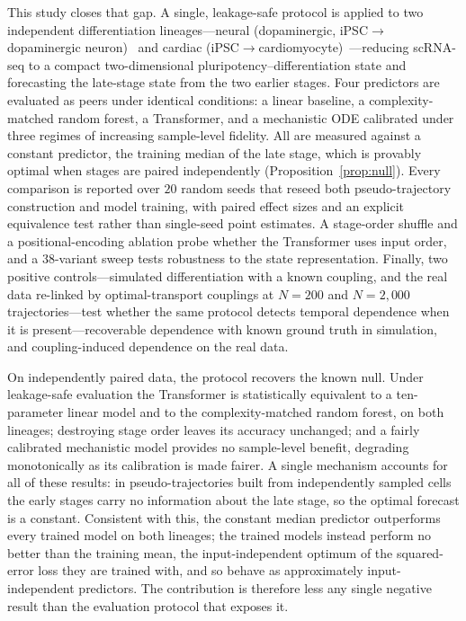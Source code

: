 \documentclass[pdflatex,sn-mathphys-num]{sn-jnl}
\theoremstyle{thmstyleone}%
\theoremstyle{thmstyletwo}%
\theoremstyle{thmstylethree}%
\begin{document}
This study closes that gap. A single, leakage-safe protocol is applied to two independent differentiation lineages---neural (dopaminergic, iPSC$\rightarrow$dopaminergic neuron)~\cite{jerber2021population} and cardiac (iPSC$\rightarrow$cardiomyocyte)~\cite{elorbany2022single}---reducing scRNA-seq to a compact two-dimensional pluripotency--differentiation state and forecasting the late-stage state from the two earlier stages. Four predictors are evaluated as peers under identical conditions: a linear baseline, a complexity-matched random forest, a Transformer, and a mechanistic ODE calibrated under three regimes of increasing sample-level fidelity. All are measured against a constant predictor, the training median of the late stage, which is provably optimal when stages are paired independently (Proposition~\ref{prop:null}). Every comparison is reported over $20$ random seeds that reseed both pseudo-trajectory construction and model training, with paired effect sizes and an explicit equivalence test rather than single-seed point estimates. A stage-order shuffle and a positional-encoding ablation probe whether the Transformer uses input order, and a $38$-variant sweep tests robustness to the state representation. Finally, two positive controls---simulated differentiation with a known coupling, and the real data re-linked by optimal-transport couplings at $N=200$ and $N=2{,}000$ trajectories---test whether the same protocol detects temporal dependence when it is present---recoverable dependence with known ground truth in simulation, and coupling-induced dependence on the real data.

On independently paired data, the protocol recovers the known null. Under leakage-safe evaluation the Transformer is statistically equivalent to a ten-parameter linear model and to the complexity-matched random forest, on both lineages; destroying stage order leaves its accuracy unchanged; and a fairly calibrated mechanistic model provides no sample-level benefit, degrading monotonically as its calibration is made fairer. A single mechanism accounts for all of these results: in pseudo-trajectories built from independently sampled cells the early stages carry no information about the late stage, so the optimal forecast is a constant. Consistent with this, the constant median predictor outperforms every trained model on both lineages; the trained models instead perform no better than the training mean, the input-independent optimum of the squared-error loss they are trained with, and so behave as approximately input-independent predictors.  The contribution is therefore less any single negative result than the evaluation protocol that exposes it.
\end{document}
